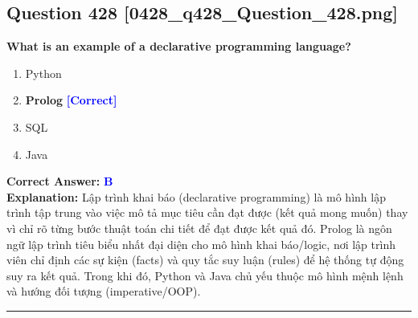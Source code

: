 \documentclass[11pt,a4paper]{article}
\begin{document}
\begin{minipage}{\textwidth}
\subsection*{Question 428 \quad \footnotesize{[0428\_q428\_Question\_428.png]}}
\noindent \textbf{What is an example of a declarative programming language?}

\begin{enumerate}[label=\Alph*.]
    \item Python
    \item \textbf{Prolog} \hfill \textcolor{blue}{\textbf{[Correct]}}
    \item SQL
    \item Java
\end{enumerate}

\noindent \textbf{Correct Answer:} \textcolor{blue}{\textbf{B}} \\[2pt]
\noindent \textbf{Explanation:} Lập trình khai báo (declarative programming) là mô hình lập trình tập trung vào việc mô tả mục tiêu cần đạt được (kết quả mong muốn) thay vì chỉ rõ từng bước thuật toán chi tiết để đạt được kết quả đó. Prolog là ngôn ngữ lập trình tiêu biểu nhất đại diện cho mô hình khai báo/logic, nơi lập trình viên chỉ định các sự kiện (facts) và quy tắc suy luận (rules) để hệ thống tự động suy ra kết quả. Trong khi đó, Python và Java chủ yếu thuộc mô hình mệnh lệnh và hướng đối tượng (imperative/OOP).

\par\vspace{0.3cm}
\hrule
\vspace{0.3cm}
\end{minipage}
\end{document}
